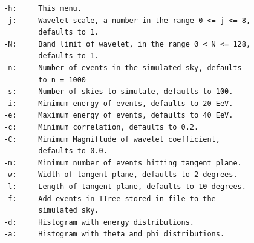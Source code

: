 \documentclass[12pt]{article}
\begin{document}
{\begin{lstlisting}
-h:     This menu.
-j:     Wavelet scale, a number in the range 0 <= j <= 8,
        defaults to 1.
-N:     Band limit of wavelet, in the range 0 < N <= 128,
        defaults to 1.
-n:     Number of events in the simulated sky, defaults
        to n = 1000
-s:     Number of skies to simulate, defaults to 100.
-i:     Minimum energy of events, defaults to 20 EeV.
-e:     Maximum energy of events, defaults to 40 EeV.
-c:     Minimum correlation, defaults to 0.2.
-C:     Minimum Magniftude of wavelet coefficient,
        defaults to 0.0.
-m:     Minimum number of events hitting tangent plane.
-w:     Width of tangent plane, defaults to 2 degrees.
-l:     Length of tangent plane, defaults to 10 degrees.
-f:     Add events in TTree stored in file to the
        simulated sky.
-d:     Histogram with energy distributions.
-a:     Histogram with theta and phi distributions.

\end{lstlisting}
}
\end{document}
